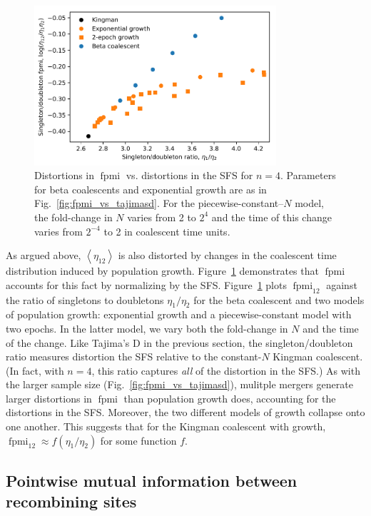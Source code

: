\documentclass[11pt, letterpaper]{article}   	%
\newcommand{\fig}[1]{Fig.~\ref{#1}}
\newcommand{\Fig}[1]{Figure~\ref{#1}}
\newcommand{\E}[1]{\left< #1 \right>}
\DeclareMathOperator{\fpmi}{fpmi}
\begin{document}
\begin{figure}
\centering
\includegraphics[width=0.8\textwidth]{figures/figure3.pdf}
\caption{Distortions in $\fpmi$ vs. distortions in the SFS for $n=4$. Parameters for beta coalescents and exponential growth are as in \fig{fig:fpmi_vs_tajimasd}. For the piecewise-constant--$N$ model, the fold-change in $N$ varies from 2 to $2^4$ and the time of this change varies from $2^{-4}$ to 2 in coalescent time units. \label{fig:sdpmi_vs_sdratio}}
\end{figure}

As argued above, $\E{\eta_{12}}$ is also distorted by changes in the coalescent time distribution induced by population growth.
\Fig{fig:sdpmi_vs_sdratio} demonstrates that $\fpmi$ accounts for this fact by normalizing by the SFS.
\Fig{fig:sdpmi_vs_sdratio} plots $\fpmi_{12}$ against the ratio of singletons to doubletons $\eta_1 / \eta_2$ for the beta coalescent and two models of population growth: exponential growth and a piecewise-constant model with two epochs.
In the latter model, we vary both the fold-change in $N$ and the time of the change.
Like Tajima's D in the previous section, the singleton/doubleton ratio measures distortion the SFS relative to the constant-$N$ Kingman coalescent.
(In fact, with $n=4$, this ratio captures \emph{all} of the distortion in the SFS.)
As with the larger sample size (\fig{fig:fpmi_vs_tajimasd}), mulitple mergers generate larger distortions in $\fpmi$ than population growth does, accounting for the distortions in the SFS.
Moreover, the two different models of growth collapse onto one another.
This suggests that for the Kingman coalescent with growth, $\fpmi_{12} \approx f(\eta_1/\eta_2)$ for some function $f$.

\subsection*{Pointwise mutual information between recombining sites}
\end{document}
